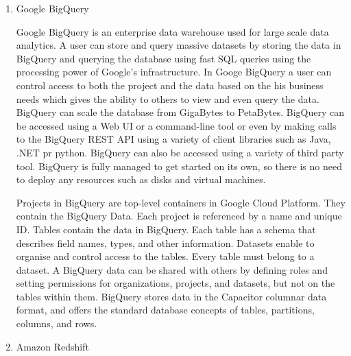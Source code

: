\begin{enumerate}
\item {} 
Google BigQuery

Google BigQuery \label{\detokenize{i524/technologies:id236}}{\hyperref[\detokenize{i524/technologies:www-bigquery}]{\sphinxcrossref{{[}199{]}}}} is an enterprise data
warehouse used for large scale data
analytics. \label{\detokenize{i524/technologies:id237}}{\hyperref[\detokenize{i524/technologies:www-bigquery-documentation}]{\sphinxcrossref{{[}200{]}}}} A user can store
and query massive datasets by storing the data in BigQuery and
querying the database using fast SQL queries using the processing
power of Google's infrastructure. In Googe BigQuery a user can
control access to both the project and the data based on the his
business needs which gives the ability to others to view and even
query the data. \label{\detokenize{i524/technologies:id238}}{\hyperref[\detokenize{i524/technologies:www-bigquery}]{\sphinxcrossref{{[}199{]}}}} BigQuery can scale the
database from GigaBytes to PetaBytes. BigQuery can be accessed
using a Web UI or a command-line tool or even by making calls to
the BigQuery REST API using a variety of client libraries such as
Java, .NET pr python. BigQuery can also be accessed using a
variety of third party tool. BigQuery is fully managed to get
started on its own, so there is no need to deploy any resources
such as disks and virtual machines.

Projects in BigQuery \label{\detokenize{i524/technologies:id239}}{\hyperref[\detokenize{i524/technologies:www-bigquery-documentation}]{\sphinxcrossref{{[}200{]}}}} are
top-level containers in Google Cloud Platform. They contain the
BigQuery Data. Each project is referenced by a name and
unique ID. Tables contain the data in BigQuery. Each table has a
schema that describes field names, types, and other
information. Datasets enable to organise and control access to
the tables. Every table must belong to a dataset. A BigQuery data
can be shared with others by defining roles and setting
permissions for organizations, projects, and datasets, but not on
the tables within them. BigQuery stores data in the
\label{\detokenize{i524/technologies:id240}}{\hyperref[\detokenize{i524/technologies:www-bigquery-columnar-storage}]{\sphinxcrossref{{[}201{]}}}} Capacitor columnar data
format, and offers the standard database concepts of tables,
partitions, columns, and rows.

\item {} 
Amazon Redshift


\end{enumerate}
